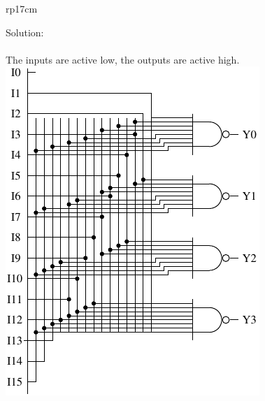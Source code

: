\documentclass{article}
\begin{document}
\begin{longtable}[l]{rp{17cm}}
\begin{minipage}[t]{\linewidth}
Solution: \\ \\
The inputs are active low, the outputs are active high.\\
\includegraphics[scale=2.0]{../Encoders/Assessments/wakerly_6_51}
\end{minipage}\\
\medskip
\end{longtable}
\end{document}
